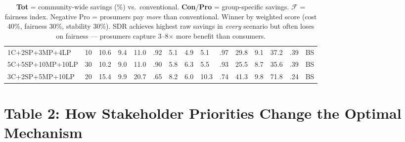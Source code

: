 \documentclass[11pt]{article}
\begin{document}
\begin{table}[h!]
\begin{tabular}{L{3.4cm} c | R{0.7cm} R{0.7cm} R{0.7cm} C{0.7cm} | R{0.7cm} R{0.7cm} R{0.7cm} C{0.7cm} | R{0.7cm} R{0.7cm} R{0.7cm} C{0.7cm} | l}
1C+2SP+3MP+4LP & 10 & 10.6 & 9.4 & 11.0 & .92 & 5.1 & 4.9 & 5.1 & .97 & 29.8 & 9.1 & 37.2 & .39 & BS \\
5C+5SP+10MP+10LP & 30 & 10.2 & 9.0 & 11.0 & .90 & 5.8 & 6.3 & 5.5 & .93 & 25.5 & 8.7 & 35.6 & .39 & BS \\
3C+2SP+5MP+10LP & 20 & 15.4 & 9.9 & 20.7 & .65 & 8.2 & 6.0 & 10.3 & .74 & 41.3 & 9.8 & 71.8 & .24 & BS \\
\bottomrule
\end{tabular}
\caption*{\textbf{Tot} = community-wide savings (\%) vs.\ conventional. \textbf{Con}/\textbf{Pro} = group-specific savings. $\mathcal{F}$ = fairness index. Negative Pro = prosumers pay \emph{more} than conventional. Winner by weighted score (cost 40\%, fairness 30\%, stability 30\%). SDR achieves highest raw savings in \emph{every} scenario but often loses on fairness --- prosumers capture 3--8$\times$ more benefit than consumers.}
\end{table}


\vspace{0.3cm}

\section*{Table 2: How Stakeholder Priorities Change the Optimal Mechanism}
\end{document}
